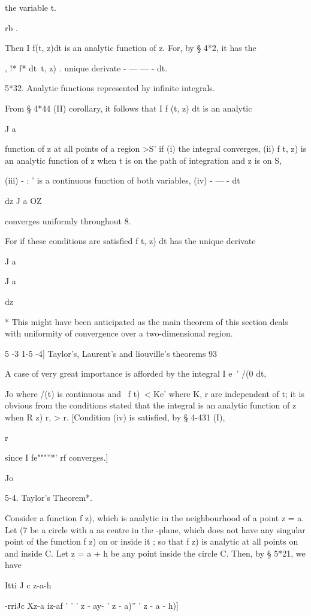 {{the variable t.

rb .

Then I f(t, z)dt is an analytic function of z. For, by § 4*2, it has
the

, !* f* dt\ t, z) . unique derivate - — — - dt.

5*32. Analytic functions represented hy infinite integrals.

From § 4*44 (II) corollary, it follows that I f (t, z) dt is an
analytic

J a

function of z at all points of a region >S' if (i) the integral
converges, (ii) f t, z) is an analytic function of z when t is on the
path of integration and z is on S,

(iii) - : ' is a continuous function of both variables, (iv) - — - dt

dz J a OZ

converges uniformly throughout 8.

For if these conditions are satisfied f t, z) dt has the unique
derivate

J a

J a

dz

* This might have been anticipated as the main theorem of this section
deals with uniformity of convergence over a two-dimensional region.

5 -3 1-5 -4] Taylor's, Laurent's and liouville's theorems 93

A case of very great importance is afforded by the integral I e~' /(0
dt,

Jo where /(t) is continuous and \ f t)\ < Ke' where K, r are
independent of t; it is obvious from the conditions stated that the
integral is an analytic function of z when R z) r, > r. [Condition
(iv) is satisfied, by § 4-431 (I),

r

since I fe"""''*' rf converges.]

Jo

5-4. Taylor's Theorem*.

Consider a function f z), which is analytic in the neighbourhood of a
point z = a. Let (7 be a circle with a as centre in the -plane, which
does not have any singular point of the function f z) on or inside it
; so that f z) is analytic at all points on and inside C. Let z = a +
h be any point inside the circle C. Then, by § 5*21, we have

    Itti J c z-a-h

 -rriJc Xz-a iz-af ' ' ' z - ay- ' z - a)'' ' z - a - h)]

}}
